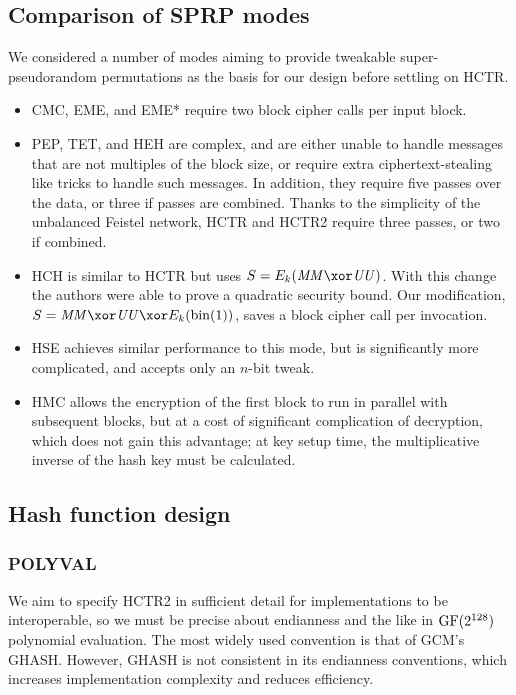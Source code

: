 \documentclass[hctr2.tex]{subfiles}
\begin{document}
\subsection{Comparison of SPRP modes}
We considered a number of modes aiming to provide
tweakable super-pseudorandom permutations
as the basis for our design before settling on HCTR.
\begin{itemize}
    \item CMC\cite{cmc}, EME\cite{eme}, and EME*\cite{emestar}
    require two block cipher calls per input block.
    \item PEP\cite{pep}, TET\cite{tet}, and HEH\cite{heh} are 
    complex, and are either
    unable to handle messages that are not multiples of the
    block size, or require extra ciphertext-stealing like tricks
    to handle such messages.
    In addition, they require five passes over the data,
    or three if passes are combined.
    Thanks to the simplicity of the unbalanced Feistel network,
    HCTR and HCTR2 require three passes, or two if combined.
    \item HCH\cite{hch} is similar to HCTR
    but uses \(S = E_k(\MM \xor \UU)\).
    With this change the authors were able to prove a
    quadratic security bound. Our modification,
    \(S = \MM \xor \UU \xor E_k(\fromint(1))\), saves
    a block cipher call per invocation.
    \item HSE\cite{hse} achieves similar performance to
    this mode, but is significantly more complicated,
    and accepts only an \(n\)-bit tweak.
    \item HMC\cite{hmc} allows the encryption of the
    first block to run in parallel with subsequent blocks,
    but at a cost of significant complication of decryption,
    which does not gain this advantage;
    at key setup time, the multiplicative inverse of
    the hash key must be calculated.
\end{itemize}

\subsection{Hash function design}\label{hashdesign}

\subsubsection{POLYVAL}\label{choosingpolyval}

We aim to specify HCTR2 in sufficient detail
for implementations to be interoperable,
so we must be precise about endianness and the like
in \(\operatorname{GF}(2^{128})\) polynomial evaluation.
The most widely used  convention is that of GCM's GHASH\cite{gcm}.
However, GHASH is not consistent in its endianness conventions,
which increases implementation complexity and reduces efficiency.
\end{document}

